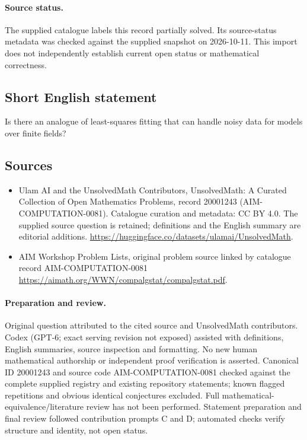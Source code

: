 \documentclass[11pt]{article}
\begin{document}
\paragraph{Source status.}
The supplied catalogue labels this record partially solved. Its source-status metadata was checked against the supplied snapshot on 2026-10-11. This import does not independently establish current open status or mathematical correctness.
\subsection{Short English statement}
Is there an analogue of least-squares fitting that can handle noisy data for models over finite fields?
\subsection{Sources}
\begin{itemize}
\item[S1] Ulam AI and the UnsolvedMath Contributors, UnsolvedMath: A Curated Collection of Open Mathematics Problems, record 20001243 (AIM-COMPUTATION-0081). Catalogue curation and metadata: CC BY 4.0. The supplied source question is retained; definitions and the English summary are editorial additions.
\url{https://huggingface.co/datasets/ulamai/UnsolvedMath}.
\item[S2] AIM Workshop Problem Lists, original problem source linked by catalogue record AIM-COMPUTATION-0081
\url{https://aimath.org/WWN/compalgstat/compalgstat.pdf}.
\end{itemize}
\paragraph{Preparation and review.}
Original question attributed to the cited source and UnsolvedMath contributors. Codex (GPT-6; exact serving revision not exposed) assisted with definitions, English summaries, source inspection and formatting. No new human mathematical authorship or independent proof verification is asserted. Canonical ID 20001243 and source code AIM-COMPUTATION-0081 checked against the complete supplied registry and existing repository statements; known flagged repetitions and obvious identical conjectures excluded. Full mathematical-equivalence/literature review has not been performed. Statement preparation and final review followed contribution prompts C and D; automated checks verify structure and identity, not open status.
\label{end:20001243}
\end{document}
